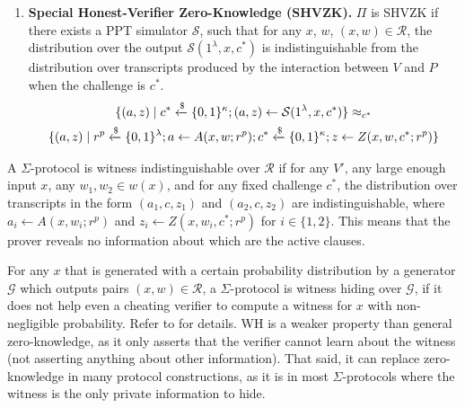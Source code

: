 \begin{definition}
\begin{enumerate}
    \item \textbf{Special Honest-Verifier Zero-Knowledge (SHVZK).} $\Pi$ is SHVZK if there exists a PPT simulator $\mathcal S$, such that for any $x$, $w$, $(x,w) \in \mathcal R$, the distribution over the output $\mathcal S(1^\lambda, x, c^*)$ is indistinguishable from the distribution over transcripts produced by the interaction between $V$ and $P$ when the challenge is $c^*$.
    \begin{multline*}
        \{(a, z) \mid c^* \xleftarrow{\$} \{0,1\}^\kappa; (a,z) \leftarrow \mathcal S(1^\lambda,x,c^*)\} 
        \approx_{c^*} \\
        \{(a,z) \mid r^p \xleftarrow{\$} \{0,1\}^\lambda; a \leftarrow A(x,w;r^p); c^* \xleftarrow{\$} \{0,1\}^\kappa; z \leftarrow Z(x,w,c^*;r^p)\}
    \end{multline*}
\end{enumerate}
\end{definition}

\begin{definition}\label{def:wi}
A $\Sigma$-protocol is witness indistinguishable over $\mathcal R$ if for any $V'$, any large enough input $x$, any $w_1,w_2 \in w(x)$, and for any fixed challenge $c^*$, the distribution over transcripts in the form $(a_1, c, z_1)$ and $(a_2,c,z_2)$ are indistinguishable, where $a_i \leftarrow A(x,w_i;r^p)$ and $z_i \leftarrow Z(x,w_i, c^*; r^p)$ for $i \in \{1,2\}$. This means that the prover reveals no information about which are the active clauses. 
\end{definition}

\begin{definition}\label{def:wh}
For any $x$ that is generated with a certain probability distribution by a generator $\mathcal G$ which outputs pairs 
$(x,w) \in \mathcal R$, a $\Sigma$-protocol is witness hiding over $\mathcal G$, if it does not help even a cheating 
verifier to compute a witness for $x$ with non-negligible probability. Refer to \cite{10.1145/100216.100272} for details. 
WH is a weaker property than general zero-knowledge, as it only asserts that the verifier cannot learn about the witness 
(not asserting anything about other information). That said, it can replace zero-knowledge in many protocol constructions, 
as it is in most $\Sigma$-protocols where the witness is the only private information to hide.

\end{definition}

